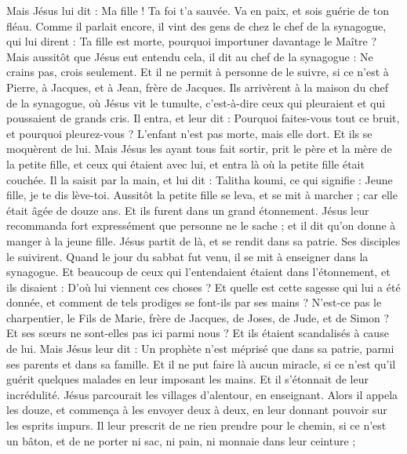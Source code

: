 \begin{multicols}{2}
Mais Jésus lui dit : Ma fille ! Ta foi t'a sauvée. Va en paix, et sois guérie de ton fléau.
Comme il parlait encore, il vint des gens de chez le chef de la synagogue, qui lui dirent : Ta fille est morte, pourquoi importuner davantage le Maître ?
Mais aussitôt que Jésus eut entendu cela, il dit au chef de la synagogue : Ne crains pas, crois seulement.
Et il ne permit à personne de le suivre, si ce n’est à Pierre, à Jacques, et à Jean, frère de Jacques.
Ils arrivèrent à la maison du chef de la synagogue, où Jésus vit le tumulte, c'est-à-dire ceux qui pleuraient et qui poussaient de grands cris.
Il entra, et leur dit : Pourquoi faites-vous tout ce bruit, et pourquoi pleurez-vous ? L’enfant n'est pas morte, mais elle dort.
Et ils se moquèrent de lui. Mais Jésus les ayant tous fait sortir, prit le père et la mère de la petite fille, et ceux qui étaient avec lui, et entra là où la petite fille était couchée.
Il la saisit par la main, et lui dit : Talitha koumi, ce qui signifie : Jeune fille, je te dis lève-toi.
Aussitôt la petite fille se leva, et se mit à marcher ; car elle était âgée de douze ans. Et ils furent dans un grand étonnement.
Jésus leur recommanda fort expressément que personne ne le sache ; et il dit qu'on donne à manger à la jeune fille.
\VerseOne{}Jésus partit de là, et se rendit dans sa patrie. Ses disciples le suivirent.
Quand le jour du sabbat fut venu, il se mit à enseigner dans la synagogue. Et beaucoup de ceux qui l'entendaient étaient dans l'étonnement, et ils disaient : D'où lui viennent ces choses ? Et quelle est cette sagesse qui lui a été donnée, et comment de tels prodiges se font-ils par ses mains ?
N’est-ce pas le charpentier, le Fils de Marie, frère de Jacques, de Joses, de Jude, et de Simon ? Et ses sœurs ne sont-elles pas ici parmi nous ? Et ils étaient scandalisés à cause de lui.
Mais Jésus leur dit : Un prophète n'est méprisé que dans sa patrie, parmi ses parents et dans sa famille.
Et il ne put faire là aucun miracle, si ce n’est qu'il guérit quelques malades en leur imposant les mains.
Et il s'étonnait de leur incrédulité. Jésus parcourait les villages d'alentour, en enseignant.
Alors il appela les douze, et commença à les envoyer deux à deux, en leur donnant pouvoir sur les esprits impurs.
Il leur prescrit de ne rien prendre pour le chemin, si ce n’est un bâton, et de ne porter ni sac, ni pain, ni monnaie dans leur ceinture ;

\end{multicols}
